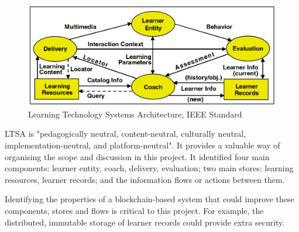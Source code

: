 \begin{figure}[!ht] 
    \centering    
    \includegraphics[width=1.0\textwidth]{ltsa2003}
    \caption[Learning Technology Systems Architecture]
        {Learning Technology Systems Architecture, IEEE Standard \citep[p.9]{ieee2003ltsa}}
    \label{fig:LTSA}
\end{figure}

LTSA is "pedagogically neutral, content-neutral, culturally neutral, implementation-neutral, 
and platform-neutral"\citep[p.1]{ieee2003ltsa}. It provides a valuable way of organising 
the scope and discussion in this project. It identified four main components: learner entity, coach, 
delivery, evaluation; two main stores: learning resources, learner records; and the information flows 
or actions between them.

Identifying the properties of a blockchain-based system that could improve these components, stores and 
flows is critical to this project. For example, the distributed, immutable storage of learner records could 
provide extra security.




